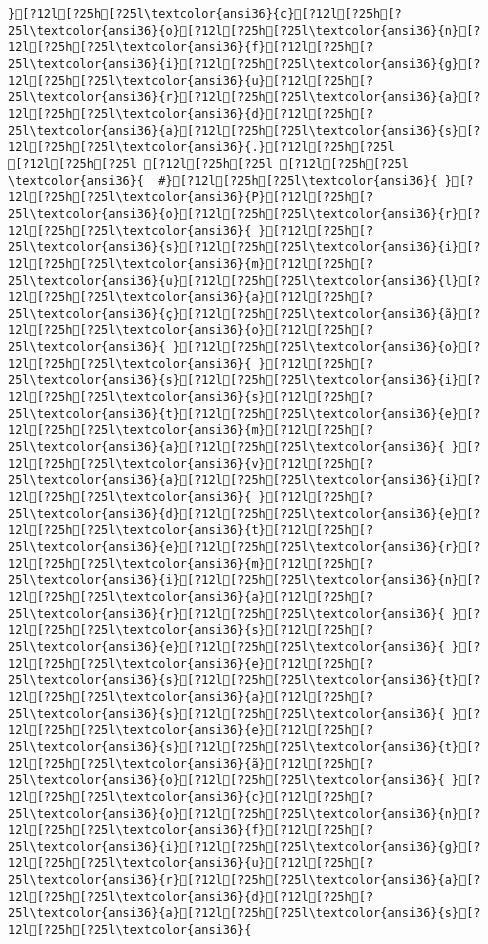 \documentclass{scrartcl}
\begin{document}
\begin{Verbatim}
}[?12l[?25h[?25l\textcolor{ansi36}{c}[?12l[?25h[?25l\textcolor{ansi36}{o}[?12l[?25h[?25l\textcolor{ansi36}{n}[?12l[?25h[?25l\textcolor{ansi36}{f}[?12l[?25h[?25l\textcolor{ansi36}{i}[?12l[?25h[?25l\textcolor{ansi36}{g}[?12l[?25h[?25l\textcolor{ansi36}{u}[?12l[?25h[?25l\textcolor{ansi36}{r}[?12l[?25h[?25l\textcolor{ansi36}{a}[?12l[?25h[?25l\textcolor{ansi36}{d}[?12l[?25h[?25l\textcolor{ansi36}{a}[?12l[?25h[?25l\textcolor{ansi36}{s}[?12l[?25h[?25l\textcolor{ansi36}{.}[?12l[?25h[?25l
[?12l[?25h[?25l [?12l[?25h[?25l [?12l[?25h[?25l
\textcolor{ansi36}{  #}[?12l[?25h[?25l\textcolor{ansi36}{ }[?12l[?25h[?25l\textcolor{ansi36}{P}[?12l[?25h[?25l\textcolor{ansi36}{o}[?12l[?25h[?25l\textcolor{ansi36}{r}[?12l[?25h[?25l\textcolor{ansi36}{ }[?12l[?25h[?25l\textcolor{ansi36}{s}[?12l[?25h[?25l\textcolor{ansi36}{i}[?12l[?25h[?25l\textcolor{ansi36}{m}[?12l[?25h[?25l\textcolor{ansi36}{u}[?12l[?25h[?25l\textcolor{ansi36}{l}[?12l[?25h[?25l\textcolor{ansi36}{a}[?12l[?25h[?25l\textcolor{ansi36}{ç}[?12l[?25h[?25l\textcolor{ansi36}{ã}[?12l[?25h[?25l\textcolor{ansi36}{o}[?12l[?25h[?25l\textcolor{ansi36}{ }[?12l[?25h[?25l\textcolor{ansi36}{o}[?12l[?25h[?25l\textcolor{ansi36}{ }[?12l[?25h[?25l\textcolor{ansi36}{s}[?12l[?25h[?25l\textcolor{ansi36}{i}[?12l[?25h[?25l\textcolor{ansi36}{s}[?12l[?25h[?25l\textcolor{ansi36}{t}[?12l[?25h[?25l\textcolor{ansi36}{e}[?12l[?25h[?25l\textcolor{ansi36}{m}[?12l[?25h[?25l\textcolor{ansi36}{a}[?12l[?25h[?25l\textcolor{ansi36}{ }[?12l[?25h[?25l\textcolor{ansi36}{v}[?12l[?25h[?25l\textcolor{ansi36}{a}[?12l[?25h[?25l\textcolor{ansi36}{i}[?12l[?25h[?25l\textcolor{ansi36}{ }[?12l[?25h[?25l\textcolor{ansi36}{d}[?12l[?25h[?25l\textcolor{ansi36}{e}[?12l[?25h[?25l\textcolor{ansi36}{t}[?12l[?25h[?25l\textcolor{ansi36}{e}[?12l[?25h[?25l\textcolor{ansi36}{r}[?12l[?25h[?25l\textcolor{ansi36}{m}[?12l[?25h[?25l\textcolor{ansi36}{i}[?12l[?25h[?25l\textcolor{ansi36}{n}[?12l[?25h[?25l\textcolor{ansi36}{a}[?12l[?25h[?25l\textcolor{ansi36}{r}[?12l[?25h[?25l\textcolor{ansi36}{ }[?12l[?25h[?25l\textcolor{ansi36}{s}[?12l[?25h[?25l\textcolor{ansi36}{e}[?12l[?25h[?25l\textcolor{ansi36}{ }[?12l[?25h[?25l\textcolor{ansi36}{e}[?12l[?25h[?25l\textcolor{ansi36}{s}[?12l[?25h[?25l\textcolor{ansi36}{t}[?12l[?25h[?25l\textcolor{ansi36}{a}[?12l[?25h[?25l\textcolor{ansi36}{s}[?12l[?25h[?25l\textcolor{ansi36}{ }[?12l[?25h[?25l\textcolor{ansi36}{e}[?12l[?25h[?25l\textcolor{ansi36}{s}[?12l[?25h[?25l\textcolor{ansi36}{t}[?12l[?25h[?25l\textcolor{ansi36}{ã}[?12l[?25h[?25l\textcolor{ansi36}{o}[?12l[?25h[?25l\textcolor{ansi36}{ }[?12l[?25h[?25l\textcolor{ansi36}{c}[?12l[?25h[?25l\textcolor{ansi36}{o}[?12l[?25h[?25l\textcolor{ansi36}{n}[?12l[?25h[?25l\textcolor{ansi36}{f}[?12l[?25h[?25l\textcolor{ansi36}{i}[?12l[?25h[?25l\textcolor{ansi36}{g}[?12l[?25h[?25l\textcolor{ansi36}{u}[?12l[?25h[?25l\textcolor{ansi36}{r}[?12l[?25h[?25l\textcolor{ansi36}{a}[?12l[?25h[?25l\textcolor{ansi36}{d}[?12l[?25h[?25l\textcolor{ansi36}{a}[?12l[?25h[?25l\textcolor{ansi36}{s}[?12l[?25h[?25l\textcolor{ansi36}{ 
\end{Verbatim}
\end{document}
